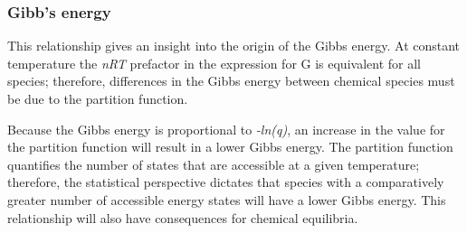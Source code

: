 \documentclass[a4paper,12pt,titlepage]{article}
\begin{document}
\begin{frame}
\frametitle{Gibb's energy}


\end{frame}

This relationship gives an insight into the origin of the Gibbs energy. At constant temperature the \textit{nRT} prefactor in the expression for G is equivalent for all species; therefore, differences in the Gibbs energy between chemical species must be due to the partition function.

Because the Gibbs energy is proportional to \textit{-ln(q)}, an increase in the value for the partition function will result in a lower Gibbs energy. The partition function quantifies the number of states that are accessible at a given temperature; therefore, the statistical perspective dictates that species with a comparatively greater number of accessible energy states will have a lower Gibbs energy. This relationship will also have consequences for chemical equilibria.
\end{document}
